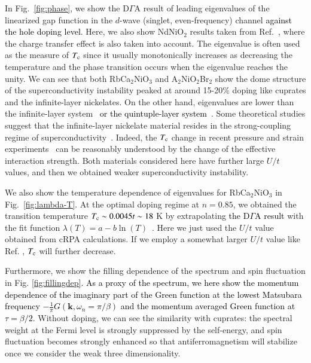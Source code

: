 \documentclass[%
 aip,
 amsmath,amssymb,
 reprint,%
]{revtex4-1}
\newcommand{\mk}[1]{{\textcolor{black}{#1}}}
\begin{document}
In Fig.~\ref{fig:phase}, we show the D$\Gamma$A result of leading eigenvalues of the linearized gap function in the $d$-wave (singlet, even-frequency) channel \mk{against the hole doping level}. Here, we also show NdNiO$_2$ results taken from Ref.~, where the charge transfer effect is also taken into account. The eigenvalue is often used as the measure of $T_{\rm c}$ since it usually monotonically increases as decreasing the temperature and the phase transition occurs when the eigenvalue reaches the unity.
We can see that both RbCa$_2$NiO$_3$ and A$_2$NiO$_2$Br$_2$ show the dome structure of the superconductivity instability peaked at around 15-20\% doping like cuprates and the infinite-layer nickelates. On the other hand, eigenvalues are lower than the infinite-layer system\mk{~\cite{Kitatani_2020} or the quintuple-layer system~\cite{Worm_2021}}. 
Some theoretical studies suggest that the infinite-layer nickelate material resides in the strong-coupling regime of superconductivity~\cite{Sakakibara_2020,Kitatani_2020}. Indeed, the $T_{\rm c}$ change in recent pressure and strain experiments~\cite{Ren_2021,NN_Wang_2021,Lee_2022} can be reasonably understood by the change of the effective interaction strength.
Both materials considered here have further large $U/t$ values, and then we obtained weaker superconductivity instability.

We also show the temperature dependence of eigenvalues for RbCa$_2$NiO$_3$ in Fig.~\ref{fig:lambda-T}. At the optimal doping regime at $n=0.85$, we obtained the transition temperature $T_{\rm c} \sim 0.0045t \sim 18$ K by extrapolating \mk{the D$\Gamma$A result} with the fit function $\lambda(T)=a-b \ln{(T)}$~\cite{Sekine_2013,Kitatani_2020}. Here we just used the $U/t$ value obtained from cRPA calculations. If we employ a somewhat larger $U/t$ value like Ref. , $T_{\rm c}$ will further decrease.

Furthermore, we show the filling dependence of the spectrum and spin fluctuation in Fig. \ref{fig:fillingdep}. \mk{As a proxy of the spectrum, we here show the momentum dependence of the imaginary part of the Green function at the lowest Matsubara frequency $-\frac{1}{\pi}G({\bm k},\omega_n=\pi/\beta)$ and the momentum averaged Green function at $\tau=\beta/2$.} Without doping, we can see the similarity with cuprates: the spectral weight at the Fermi level is strongly suppressed by the self-energy, and spin fluctuation becomes strongly enhanced so that antiferromagnetism will stabilize once we consider the weak three dimensionality.
\end{document}
